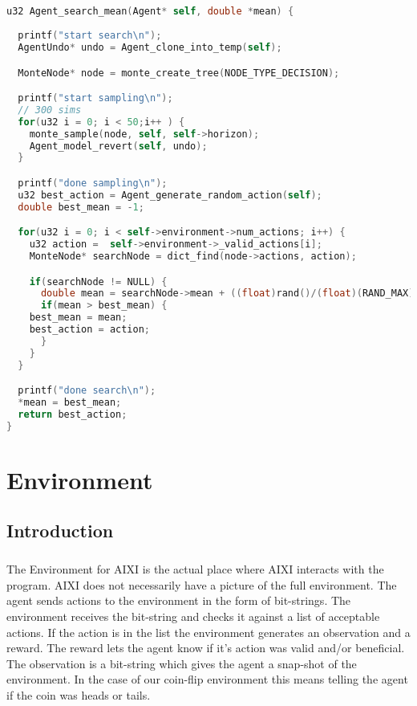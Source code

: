 \documentclass[fancychapters]{report}   	%
\begin{document}
\paragraph{}

\begin{lstlisting}[language=C]
u32 Agent_search_mean(Agent* self, double *mean) {
  
  printf("start search\n");
  AgentUndo* undo = Agent_clone_into_temp(self);

  MonteNode* node = monte_create_tree(NODE_TYPE_DECISION);

  printf("start sampling\n");
  // 300 sims
  for(u32 i = 0; i < 50;i++ ) {
    monte_sample(node, self, self->horizon);
    Agent_model_revert(self, undo);
  }

  printf("done sampling\n");
  u32 best_action = Agent_generate_random_action(self);
  double best_mean = -1;

  for(u32 i = 0; i < self->environment->num_actions; i++) {
    u32 action =  self->environment->_valid_actions[i];
    MonteNode* searchNode = dict_find(node->actions, action);

    if(searchNode != NULL) {
      double mean = searchNode->mean + ((float)rand()/(float)(RAND_MAX)) * 0.0001;
      if(mean > best_mean) {
	best_mean = mean;
	best_action = action;
      }
    }
  }

  printf("done search\n");
  *mean = best_mean;
  return best_action;
}
\end{lstlisting}


\chapter{Environment}
\section{Introduction}
\paragraph{}The Environment for AIXI is the actual place where AIXI interacts with the program.  AIXI does not necessarily have a picture of the full environment.  The agent sends actions to the environment in the form of bit-strings.  The environment receives the bit-string and checks it against a list of acceptable actions.  If the action is in the list the environment generates an observation and a reward.  The reward lets the agent know if it's action was valid and/or beneficial. The observation is a bit-string which gives the agent a snap-shot of the environment.  In the case of our coin-flip environment this means telling the agent if the coin was heads or tails. 
\end{document}
